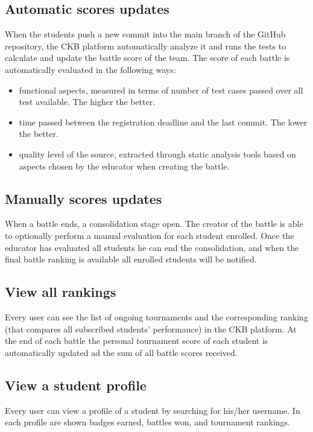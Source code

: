\subsection{Automatic scores updates}
When the students push a new commit into the main branch of the GitHub repository, the CKB platform automatically analyze it and runs the tests to calculate and update the battle score of the team.\newline
The score of each battle is automatically evaluated in the following ways:
\begin{itemize}
        \item functional aspects, measured in terms of number of test cases passed over all test available. The higher the better.
        \item time passed between the registration deadline and the last commit. The lower the better.
        \item quality level of the source, extracted through static analysis tools based on aspects chosen by the educator when creating the battle. 
\end{itemize}

\subsection{Manually scores updates}
When a battle ends, a consolidation stage open. The creator of the battle is able to optionally perform a manual evaluation for each student enrolled.
Once the educator has evaluated all students he can end the consolidation, and when the final battle ranking is available all enrolled students will be notified.

\subsection{View all rankings}
Every user can see the list of ongoing tournaments and the corresponding ranking (that compares all subscribed students' performance) in the CKB platform.
At the end of each battle the personal tournament score of each student is automatically updated ad the sum of all battle scores received. 

\subsection{View a student profile}
Every user can view a profile of a student by searching for his/her username. In each profile are shown badges earned, battles won, and tournament rankings. 

